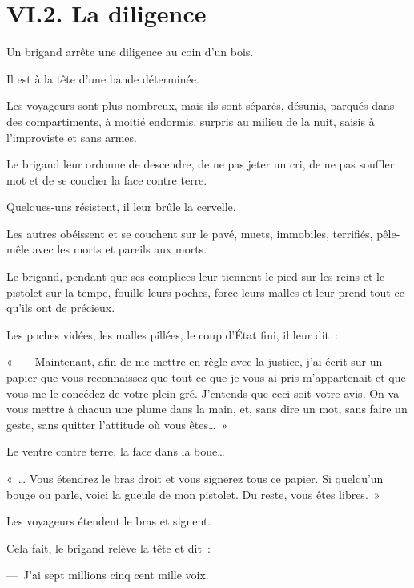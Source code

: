 \documentclass[french,twoside]{book} %
\newenvironment{quoteblock}%
  {\begin{quoting}}
  {\end{quoting}}
\newenvironment{quotebar}{%
    \def\FrameCommand{{\color{rubric!10!}\vrule width 0.5em} \hspace{0.9em}}%
    \def\OuterFrameSep{0pt} %
    \MakeFramed {\advance\hsize-\width \FrameRestore}
  }%
  {%
    \endMakeFramed
  }
\renewenvironment{quoteblock}%
  {%
    \savenotes
    \setstretch{0.9}
    \begin{quotebar}
    \smallskip
  }
  {%
    \smallskip
    \end{quotebar}
    \spewnotes
  }
\begin{document}
\section[{VI.2. La diligence}]{VI.2. La diligence}

Un brigand arrête une diligence au coin d’un bois.\par
Il est à la tête d’une bande déterminée.\par
Les voyageurs sont plus nombreux, mais ils sont séparés, désunis, parqués dans des compartiments, à moitié endormis, surpris au milieu de la nuit, saisis à l’improviste et sans armes.\par
Le brigand leur ordonne de descendre, de ne pas jeter un cri, de ne pas souffler mot et de se coucher la face contre terre.\par
Quelques-uns résistent, il leur brûle la cervelle.\par
Les autres obéissent et se couchent sur le pavé, muets, immobiles, terrifiés, pêle-mêle avec les morts et pareils aux morts.\par
Le brigand, pendant que ses complices leur tiennent le pied sur les reins et le pistolet sur la tempe, fouille leurs poches, force leurs malles et leur prend tout ce qu’ils ont de précieux.\par
Les poches vidées, les malles pillées, le coup d’État fini, il leur dit :\par

\begin{quoteblock}
 \noindent « — Maintenant, afin de me mettre en règle avec la justice, j’ai écrit sur un papier que vous reconnaissez que tout ce que je vous ai pris m’appartenait et que vous me le concédez de votre plein gré. J’entends que ceci soit votre avis. On va vous mettre à chacun une plume dans la main, et, sans dire un mot, sans faire un geste, sans quitter l’attitude où vous êtes… »
 \end{quoteblock}

Le ventre contre terre, la face dans la boue…\par

\begin{quoteblock}
 \noindent « … Vous étendrez le bras droit et vous signerez tous ce papier. Si quelqu’un bouge ou parle, voici la gueule de mon pistolet. Du reste, vous êtes libres. »
 \end{quoteblock}

Les voyageurs étendent le bras et signent.\par
Cela fait, le brigand relève la tête et dit :\par
— J’ai sept millions cinq cent mille voix.
\end{document}
